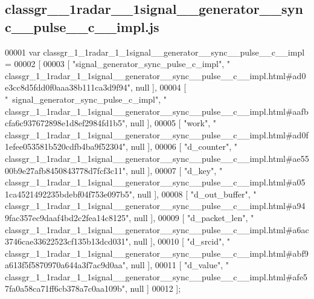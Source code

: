 \subsection{classgr\+\_\+\_\+1radar\+\_\+\_\+1signal\+\_\+\+\_\+generator\+\_\+\+\_\+sync\+\_\+\+\_\+pulse\+\_\+\+\_\+c\+\_\+\+\_\+impl.\+js}
\label{classgr__1__1radar__1__1signal____generator____sync____pulse____c____impl_8js_source}

\begin{DoxyCode}
00001 var classgr_1_1radar_1_1signal__generator__sync__pulse__c__impl =
00002 [
00003     [ \textcolor{stringliteral}{"signal\_generator\_sync\_pulse\_c\_impl"}, \textcolor{stringliteral}{"
      classgr\_1\_1radar\_1\_1signal\_\_generator\_\_sync\_\_pulse\_\_c\_\_impl.html#ad0e3cc8d5fdd0f0aaa38b111ca3d9f94"}, null ],
00004     [ \textcolor{stringliteral}{"~signal\_generator\_sync\_pulse\_c\_impl"}, \textcolor{stringliteral}{"
      classgr\_1\_1radar\_1\_1signal\_\_generator\_\_sync\_\_pulse\_\_c\_\_impl.html#aafbcfa6c937672898e1d8ef2984fd1b5"}, null ],
00005     [ \textcolor{stringliteral}{"work"}, \textcolor{stringliteral}{"
      classgr\_1\_1radar\_1\_1signal\_\_generator\_\_sync\_\_pulse\_\_c\_\_impl.html#ad0f1efee053581b520cdfb4ba9f52304"}, null ],
00006     [ \textcolor{stringliteral}{"d\_counter"}, \textcolor{stringliteral}{"
      classgr\_1\_1radar\_1\_1signal\_\_generator\_\_sync\_\_pulse\_\_c\_\_impl.html#ae5500b9e27afb8450843778d7fcf3c11"}, null ],
00007     [ \textcolor{stringliteral}{"d\_key"}, \textcolor{stringliteral}{"
      classgr\_1\_1radar\_1\_1signal\_\_generator\_\_sync\_\_pulse\_\_c\_\_impl.html#a051ca4521492235bdebf04f753e097b5"}, null ],
00008     [ \textcolor{stringliteral}{"d\_out\_buffer"}, \textcolor{stringliteral}{"
      classgr\_1\_1radar\_1\_1signal\_\_generator\_\_sync\_\_pulse\_\_c\_\_impl.html#a949fac357ec9daaf4bd2c2fea14c8125"}, null ],
00009     [ \textcolor{stringliteral}{"d\_packet\_len"}, \textcolor{stringliteral}{"
      classgr\_1\_1radar\_1\_1signal\_\_generator\_\_sync\_\_pulse\_\_c\_\_impl.html#a6ac3746cae33622523cf135b13dcd031"}, null ],
00010     [ \textcolor{stringliteral}{"d\_srcid"}, \textcolor{stringliteral}{"
      classgr\_1\_1radar\_1\_1signal\_\_generator\_\_sync\_\_pulse\_\_c\_\_impl.html#abf9a613f5f5870970a644a3f7ac9d0aa"}, null ],
00011     [ \textcolor{stringliteral}{"d\_value"}, \textcolor{stringliteral}{"
      classgr\_1\_1radar\_1\_1signal\_\_generator\_\_sync\_\_pulse\_\_c\_\_impl.html#afe57fa0a58ca71ff6cb378a7c0aa109b"}, null ]
00012 ];
\end{DoxyCode}
